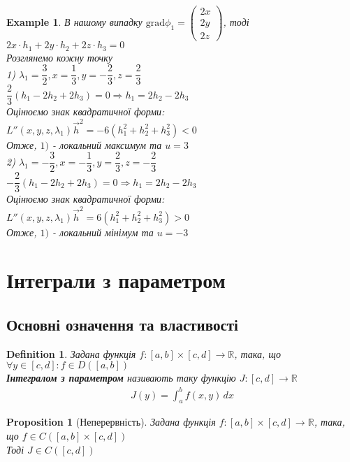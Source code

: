 \documentclass[a4paper, 14pt]{extarticle}
\def\bigline{\vspace{5mm}\\}
\theoremstyle{theoremdd}
\theoremstyle{theoremdd}
\newtheorem{definition}[theorem]{Definition}
\theoremstyle{theoremdd}
\newtheorem{proposition}[theorem]{Proposition}
\theoremstyle{theoremdd}
\theoremstyle{theoremdd}
\theoremstyle{theoremdd}
\theoremstyle{theoremdd}
\newtheorem{example}[theorem]{Example}
\begin{document}
\begin{example}
В нашому випадку $\textrm{grad} \phi_1 = \begin{pmatrix}
2x \\ 2y \\ 2z
\end{pmatrix}$, тоді\\
$2x \cdot h_1 + 2y \cdot h_2 + 2z \cdot h_3 = 0$\\
Розглянемо кожну точку\\
1) $\lambda_1 = \dfrac{3}{2}, x = \dfrac{1}{3}, y = -\dfrac{2}{3}, z = \dfrac{2}{3}$\\
$\dfrac{2}{3} \left(h_1 - 2h_2 + 2h_3 \right) = 0 \Rightarrow h_1 = 2h_2 - 2h_3$\\
Оцінюємо знак квадратичної форми:\\
$L''(x,y,z,\lambda_1) \vec{h}^2 = -6(h_1^2+h_2^2+h_3^2) < 0$\\
Отже, $1)$ - локальний максимум та $u = 3$
\bigline
2) $\lambda_1 = -\dfrac{3}{2}, x = -\dfrac{1}{3}, y = \dfrac{2}{3}, z = -\dfrac{2}{3}$\\
$-\dfrac{2}{3} \left(h_1 - 2h_2 + 2h_3 \right) = 0 \Rightarrow h_1 = 2h_2 - 2h_3$\\
Оцінюємо знак квадратичної форми:\\
$L''(x,y,z,\lambda_1) \vec{h}^2 = 6(h_1^2+h_2^2+h_3^2) > 0$\\
Отже, $1)$ - локальний мінімум та $u = -3$

\end{example}
\newpage

\section{Інтеграли з параметром}
\subsection{Основні означення та властивості}
\begin{definition}
Задана функція $f: [a,b] \times [c,d] \to \mathbb{R}$, така, що \\ $\forall y \in [c,d]: f \in D([a,b])$\\
\textbf{Інтегралом з параметром} називають таку функцію $J: [c,d] \to \mathbb{R}$
\begin{align*}
J(y) = \int_a^b f(x,y)\,dx
\end{align*}
\end{definition}

\begin{proposition}[Неперервність]
Задана функція $f: [a,b] \times [c,d] \to \mathbb{R}$, така, що $f \in C([a,b] \times [c,d])$\\
Тоді $J \in C([c,d])$
\end{proposition}
\end{document}
